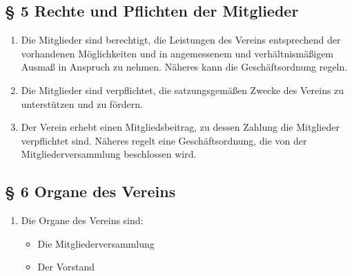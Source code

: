 ﻿\documentclass[10pt,a4paper]{scrartcl}
\begin{document}
\subsection*{§ 5 Rechte und Pflichten der Mitglieder}
\begin{enumerate}
	\item Die Mitglieder sind berechtigt, die Leistungen des Vereins entsprechend der vorhandenen
		Möglichkeiten und in angemessenem und verhältnismäßigem Ausmaß in Anspruch zu nehmen.
                Nä\-he\-res kann die Geschäftsordnung regeln.
	\item Die Mitglieder sind verpflichtet, die satzungsgemäßen Zwecke des Vereins zu unterstützen
		und zu fördern.
	\item Der Verein erhebt einen Mitgliedsbeitrag, zu dessen Zahlung die Mitglieder verpflichtet
		sind. Näheres regelt eine Geschäftsordnung, die von der Mitgliederversammlung beschlossen
		wird.
        
\end{enumerate}
%
%
\subsection*{§ 6 Organe des Vereins }
\begin{enumerate}
	\item Die Organe des Vereins sind:
		\begin{itemize}
			\item Die Mitgliederversammlung
			\item Der Vorstand
		\end{itemize}
\end{enumerate}
%
%
\end{document}

